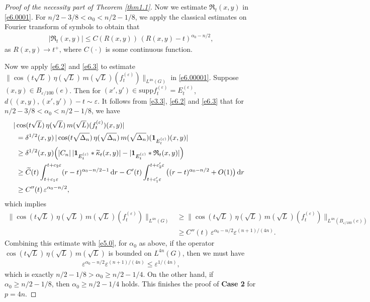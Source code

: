 \documentclass[a4paper,12pt]{amsart}
\numberwithin{equation}{section}
\theoremstyle{definition}
\theoremstyle{remark}
\numberwithin{theorem}{section}
\newcommand{\indicator}{\mathbf{1}}
\newcommand{\supp}{\mathrm{supp}}
\renewcommand{\d}{\mathrm{d}}
\begin{document}
\begin{proof}[Proof of the necessity part of Theorem \ref{thm1.1}]
Now we estimate $\mathfrak{R}_t(x,y)$ in \eqref{e6.0001}. For $n/2-3/8<\alpha_0<n/2-1/8$, we apply the classical estimates on Fourier transform of symbols \cite[p. 241]{St} to obtain that
\begin{align}\label{e6.3}
|\mathfrak{R}_t(x,y)|\leq C(R(x,y))\, (R(x,y)-t)^{\alpha_0-n/2},
\end{align}
as $R(x,y)\to t^+$, where $C(\cdot)$ is some continuous function.

Now we apply \eqref{e6.2} and \eqref{e6.3} to estimate $\|\cos (t\sqrt{L})\,\eta(\sqrt{L})\,m(\sqrt{L})(f^{(\varepsilon)}_t)\|_{L^{4n}(G)}$ in \eqref{e6.00001}. Suppose $(x,y)\in B_{\varepsilon/100}(e)$. Then for $(x', y')\in \supp f^{(\varepsilon)}_t=E^{(\varepsilon)}_t$, $d((x,y), (x', y'))-t\sim \varepsilon$. It follows from \eqref{e3.3}, \eqref{e6.2} and \eqref{e6.3} that for $n/2-3/8<\alpha_0<n/2-1/8$, we have
\begin{align*}
&\hspace{-0.6cm}|\cos (t\sqrt{L})\,\eta(\sqrt{L})\,m(\sqrt{L})(f^{(\varepsilon)}_t)(x,y)|\\
={}&\delta^{1/2}(x,y)\,|\cos (t\sqrt{\Delta_n})\,\eta(\sqrt{\Delta_n})\,m(\sqrt{\Delta_n})(\indicator_{E^{(\varepsilon)}_t})(x,y)|\\
\geq{}&\delta^{1/2}(x,y)\Big(|C_n|\,|\indicator_{E^{(\varepsilon)}_t}*\widetilde{\kappa}_t(x,y)|-|\indicator_{E^{(\varepsilon)}_t}*\mathfrak{R}_t(x,y)|\Big)\\
\geq{}&\widetilde{C}(t) \int_{t+c_1\varepsilon}^{t+c_2\varepsilon}(r-t)^{\alpha_0-n/2-1}\,\d r-C'(t) \int_{t+c'_1\varepsilon}^{t+c'_2\varepsilon}\big((r-t)^{\alpha_0-n/2}+O(1)\big)\,\d r\\
\geq{}&C''(t)\, \varepsilon^{\alpha_0-n/2},
\end{align*}
which implies
\begin{align*}
\|\cos (t\sqrt{L})\,\eta(\sqrt{L})\,m(\sqrt{L})(f^{(\varepsilon)}_t)\|_{L^{4n}(G)}&\geq\|\cos (t\sqrt{L})\,\eta(\sqrt{L})\,m(\sqrt{L})(f^{(\varepsilon)}_t)\|_{L^{4n}(B_{\varepsilon/100}(e))}\\
&\geq C''(t)\, \varepsilon^{\alpha_0-n/2} \varepsilon^{(n+1)/(4n)}.
\end{align*}
Combining this estimate with \eqref{e5.0}, for $\alpha_0$ as above, if the operator $\cos (t\sqrt{L})\,\eta(\sqrt{L})\,m(\sqrt{L})$ is bounded on $L^{4n}(G)$, then we must have
\begin{align*}
\varepsilon^{\alpha_0-n/2} \varepsilon^{(n+1)/(4n)}\leq \varepsilon^{1/(4n)},
\end{align*}
which is exactly $n/2-1/8>\alpha_0\geq n/2-1/4$.
On the other hand, if $\alpha_0\geq n/2-1/8$, then 
$\alpha_0\geq n/2-1/4$ holds.
This finishes the proof of {\bf Case 2} for $p=4n$.
\medskip


\end{proof}
\end{document}
